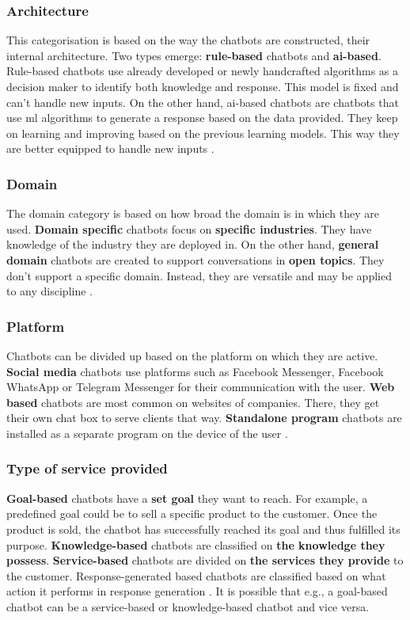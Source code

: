 \subsubsection{Architecture}
This categorisation is based on the way the chatbots are constructed, their internal architecture. Two types emerge: \textbf{rule-based} chatbots and \textbf{ai-based}. Rule-based chatbots use already developed or newly handcrafted algorithms as a decision maker to identify both knowledge and response. This model is fixed and can’t handle new inputs. On the other hand, \acrshort{ai}-based chatbots are chatbots that use \acrlong{ml} algorithms to generate a response based on the data provided. They keep on learning and improving based on the previous learning models. This way they are better equipped to handle new inputs \citep{Maroengsit2019}.\\

\subsubsection{Domain}
The domain category is based on how broad the domain is in which they are used. \textbf{Domain specific} chatbots focus on \textbf{specific industries}. They have knowledge of the industry they are deployed in. On the other hand, \textbf{general domain} chatbots are created to support conversations in \textbf{open topics}. They don’t support a specific domain. Instead, they are versatile and may be applied to any discipline \citep{Maroengsit2019}.\\

\subsubsection{Platform}
Chatbots can be divided up based on the platform on which they are active. \textbf{Social media} chatbots use platforms such as Facebook Messenger, Facebook WhatsApp or Telegram Messenger for their communication with the user. \textbf{Web based} chatbots are most common on websites of companies. There, they get their own chat box to serve clients that way. \textbf{Standalone program} chatbots are installed as a separate program on the device of the user \citep*{Maroengsit2019, Xu2017, CICBA2018}.\\

\subsubsection{Type of service provided}
\textbf{Goal-based} chatbots have a \textbf{set goal} they want to reach. For example, a predefined goal could be to sell a specific product to the customer. Once the product is sold, the chatbot has successfully reached its goal and thus fulfilled its purpose. \textbf{Knowledge-based} chatbots are classified on \textbf{the knowledge they possess}. \textbf{Service-based} chatbots are divided on \textbf{the services they provide} to the customer. Response-generated based chatbots are classified based on what action it performs in response generation \citep{Nuruzzaman2018}. It is possible that e.g., a goal-based chatbot can be a service-based or knowledge-based chatbot and vice versa.\\

